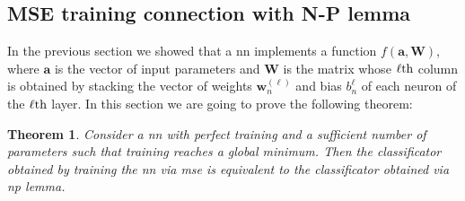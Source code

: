 \documentclass[draftcls,onecolumn,12pt]{IEEEtran}
\newtheorem{theorem}{Theorem}
\begin{document}
\subsection{MSE training connection with N-P lemma}
In the previous section we showed that a \ac{nn} implements a function $f(\bm{a},\bm{W})$, where $\bm{a}$ is the vector of input parameters and $\bm{W}$ is the matrix whose $\ell{\rm th}$ column is obtained by stacking the vector of weights $\bm{w}_n^{(\ell)}$ and bias $b_n^{\ell}$ of each neuron of the $\ell{\rm th}$ layer. In this section we are going to prove the following theorem:
\begin{theorem}
\label{th:nn_np}
Consider a \ac{nn} with perfect training and a sufficient number of parameters such that training reaches a global minimum. Then the classificator obtained by training the \ac{nn} via \ac{mse} is equivalent to the classificator obtained via \ac{np} lemma.
\end{theorem}
\end{document}

